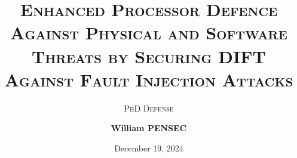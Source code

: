 \title{\textsc{Enhanced Processor Defence Against Physical and Software Threats by Securing DIFT Against Fault Injection Attacks}}
\subtitle{\textsc{PhD Defense}}
\author[
    William PENSEC
]{
    \textbf{William PENSEC}
}
\date{December 19, 2024}

